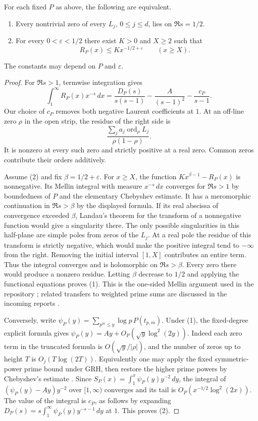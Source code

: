 \begin{theorem}
For each fixed $P$ as above, the following are equivalent.
\begin{enumerate}
\item Every nontrivial zero of every $L_j$, $0\le j\le d$, lies on $\Re s=1/2$.
\item For every $0<\varepsilon<1/2$ there exist $K>0$ and $X\ge2$ such that
\[
 R_P(x)\le Kx^{-1/2+\varepsilon}\qquad(x\ge X).
\]
\end{enumerate}
The constants may depend on $P$ and $\varepsilon$.
\end{theorem}
\begin{proof}
For $\Re s>1$, termwise integration gives
\[
 \int_1^\infty R_P(x)x^{-s}\,dx
 =\frac{D_P(s)}{s(s-1)}-\frac{A}{(s-1)^2}-\frac{c_P}{s-1}.
\]
Our choice of $c_P$ removes both negative Laurent coefficients at $1$. At an off-line zero $\rho$ in the open strip, the residue of the right side is
\[
 \frac{\sum_j a_j\operatorname{ord}_{\rho}L_j}{\rho(1-\rho)}.
\]
It is nonzero at every such zero and strictly positive at a real zero. Common zeros contribute their orders additively.

Assume (2) and fix $\beta=1/2+\varepsilon$. For $x\ge X$, the function
$Kx^{\beta-1}-R_P(x)$ is nonnegative. Its Mellin integral with measure $x^{-s}\,dx$ converges for $\Re s>1$ by boundedness of $P$ and the elementary Chebyshev estimate. It has a meromorphic continuation in $\Re s>\beta$ by the displayed formula. If its real abscissa of convergence exceeded $\beta$, Landau's theorem for the transform of a nonnegative function would give a singularity there. The only possible singularities in this half-plane are simple poles from zeros of the $L_j$. At a real pole the residue of this transform is strictly negative, which would make the positive integral tend to $-\infty$ from the right. Removing the initial interval $[1,X]$ contributes an entire term. Thus the integral converges and is holomorphic on $\Re s>\beta$. Every zero there would produce a nonzero residue. Letting $\beta$ decrease to $1/2$ and applying the functional equations proves (1). This is the one-sided Mellin argument used in the repository \cite{source}; related transfers to weighted prime sums are discussed in the incoming reports \cite{deficit}.

Conversely, write $\psi_P(y)=\sum_{p^m\le y}\log p\,P(t_{p,m})$. Under (1), the fixed-degree explicit formula gives
$\psi_P(y)=Ay+O_P(\sqrt y\log^2(2y))$.
Indeed each zero term in the truncated formula is $O(\sqrt y/|\rho|)$, and the number of zeros up to height $T$ is $O_j(T\log(2T))$. Equivalently one may apply the fixed symmetric-power prime bound under GRH, then restore the higher prime powers by Chebyshev's estimate \cite{rtc}. Since $S_P(x)=\int_1^x\psi_P(y)y^{-2}\,dy$, the integral of $(\psi_P(y)-Ay)y^{-2}$ over $[1,\infty)$ converges and its tail is $O_P(x^{-1/2}\log^2(2x))$. The value of the integral is $c_P$, as follows by expanding $D_P(s)=s\int_1^\infty\psi_P(y)y^{-s-1}\,dy$ at $1$. This proves (2).
\end{proof}

